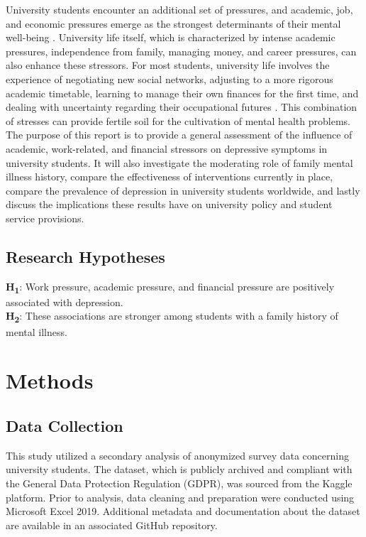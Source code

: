 \documentclass[conference]{IEEEtran}
\begin{document}
University students encounter an additional set of pressures, and academic, job, and economic pressures emerge as the strongest determinants of their mental well-being \cite{b4}. University life itself, which is characterized by intense academic pressures, independence from family, managing money, and career pressures, can also enhance these stressors\cite{b5}.
For most students, university life involves the experience of negotiating new social networks, adjusting to a more rigorous academic timetable, learning to manage their own finances for the first time, and dealing with uncertainty regarding their occupational futures \cite{b6}.  This combination of stresses can provide fertile soil for the cultivation of mental health problems. The purpose of this report is to provide a general assessment of the influence of academic, work-related, and financial stressors on depressive symptoms in university students. It will also investigate the moderating role of family mental illness history, compare the effectiveness of interventions currently in place, compare the prevalence of depression in university students worldwide, and lastly discuss the implications these results have on university policy and student service provisions. 

\subsection{Research Hypotheses}
\textbf{H\textsubscript{1}}: Work pressure, academic pressure, and financial pressure are positively associated with depression.\\

\textbf{H\textsubscript{2}}: These associations are stronger among students with a family history of mental illness.

\section{Methods}

\subsection{Data Collection}
This study utilized a secondary analysis of anonymized survey data concerning university students. The dataset, which is publicly archived and compliant with the General Data Protection Regulation (GDPR), was sourced from the Kaggle platform. Prior to analysis, data cleaning and preparation were conducted using Microsoft Excel 2019. Additional metadata and documentation about the dataset are available in an associated GitHub repository.
\end{document}
